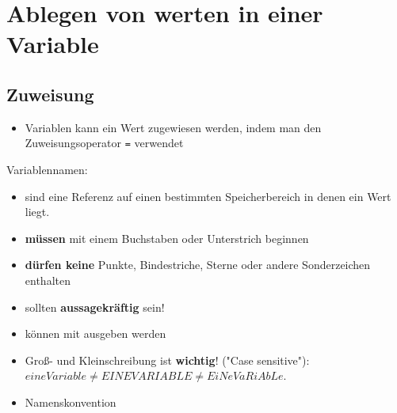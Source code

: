 \section{Ablegen von werten in einer Variable}
\subsection{Zuweisung}
\begin{frame}
    \slidehead
    \begin{itemize}[<+->]
        \item Variablen kann ein Wert zugewiesen werden, indem man den Zuweisungsoperator \lstinline{=} verwendet\\

    \end{itemize}
    \onslide<+->
\end{frame}

\begin{frame}
    \slidehead

    Variablennamen:
    \begin{itemize}[<+->]
        \item sind eine Referenz auf einen bestimmten Speicherbereich in denen ein Wert liegt.
        \item \textbf{müssen} mit einem Buchstaben oder Unterstrich beginnen
        \item \textbf{dürfen keine} Punkte, Bindestriche, Sterne oder andere Sonderzeichen enthalten
        \item sollten \textbf{aussagekräftig} sein!
        \item können mit  ausgeben werden %
        \item Groß- und Kleinschreibung ist \textbf{wichtig}! ("Case sensitive"):\\ $eineVariable \neq EINEVARIABLE \neq EiNeVaRiAbLe$.
        \item Namenskonvention 
    \end{itemize}
\end{frame}

\livecoding



